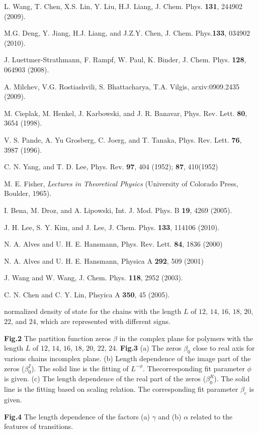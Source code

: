 \documentclass[aps,pre,twocolumn,showpacs,preprintnumbers,amsmath,amssymb]{revtex4-1}
\begin{document}
\begin{thebibliography}{10}
 L. Wang, T. Chen, X.S. Lin, Y. Liu, H.J. Liang,
J. Chem. Phys. {\bf 131}, 244902 (2009).

 M.G. Deng, Y. Jiang, H.J. Liang, and J.Z.Y.
Chen, J. Chem. Phys.{\bf 133}, 034902 (2010).

 J. Luettmer-Strathmann, F. Rampf, W. Paul, K.
Binder, J. Chem. Phys. {\bf 128}, 064903 (2008).

 A. Milchev, V.G. Rostiashvili, S. Bhattacharya,
T.A. Vilgis, arxiv:0909.2435 (2009).

 M. Cieplak, M. Henkel, J. Karbowski, and
J. R. Banavar, Phys. Rev. Lett. {\bf 80}, 3654 (1998).

 V. S. Pande, A. Yu Grosberg, C. Joerg, and
T. Tanaka, Phys. Rev. Lett. {\bf 76}, 3987 (1996).

 C. N. Yang, and T. D. Lee, Phys. Rev. {\bf 97},
404 (1952); {\bf 87}, 410(1952)

 M. E. Fisher, {\it Lectures in Theoretical
Physics} (University of Colorado Press, Boulder, 1965).

 I. Bena, M. Droz, and A. Lipowski,
Int. J. Mod. Phys. B {\bf 19}, 4269 (2005).

 J. H. Lee, S. Y. Kim, and J. Lee, J. Chem.
Phys. {\bf 133}, 114106 (2010).

 N. A. Alves and U. H. E. Hansmann, Phys.
Rev. Lett. {\bf 84}, 1836 (2000)

 N. A. Alves and U. H. E. Hansmann,
Physica A {\bf 292}, 509 (2001)

 J. Wang and W. Wang, J. Chem. Phys. {\bf
118}, 2952 (2003).

 C. N. Chen and C. Y. Lin, Phsyica A {\bf
350}, 45 (2005).

\end{thebibliography}

normalized density of state for the chains with the length $L$
of $12$, $14$, $16$, $18$, $20$, $22$, and $24$, which are
represented with different signs.

\vspace{0.5cm} \parindent 0pt {\large {\bf Fig.2}} The partition
function zeros $\beta$ in the complex plane for polymers with
the length $L$ of $12$, $14$, $16$, $18$, $20$, $22$, $24$.
\vspace{0.5cm} \parindent 0pt {\large {\bf Fig.3}} (a) The zeros
$\beta_0$ close to real axis for various chains incomplex plane.
(b) Length dependence of the image part of the zeros
($\beta_0^I$). The solid line is the fitting of $L^{-\phi}$.
Thecorresponding fit parameter $\phi$ is given. (c) The length
dependence of the real part of the zeros ($\beta_0^R$). The
solid line is the fitting based on scaling relation. The
corresponding fit parameter $\beta_c$ is given.

\vspace{0.5cm} \parindent 0pt {\large {\bf Fig.4}} The length
dependence of the factors (a) $\gamma$ and (b) $\alpha$ related
to the features of transitions.


\end{document}
